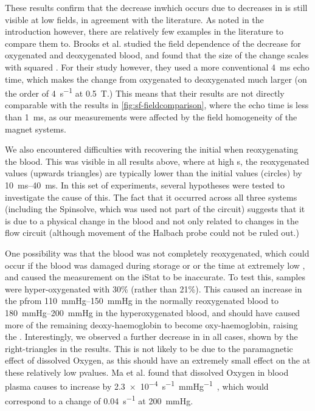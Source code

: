 These results confirm that the decrease in\Ttwo which occurs due to decreases in \SOtwo is still visible at low fields, in agreement with the literature.
As noted in the introduction however, there are relatively few examples in the literature to compare them to.
Brooks et al. studied the field dependence of the \Ttwo decrease for oxygenated and deoxygenated blood, and found that the size of the \Rtwo change scales with \Bzero  squared \cite[Fig.1]{BrooksComparisont2relaxation1995}.
For their study however, they used a more conventional \SI{4}{ms} echo time, which makes the \Rtwo change from oxygenated to deoxygenated much larger (on the order of \SI{4}{s^{-1}} at \SI{0.5}{T}.)
This means that their results are not directly comparable with the results in \autoref{fig:sf-fieldcomparison}, where the echo time is less than \SI{1}{ms}, as our measurements were affected by the field homogeneity of the magnet systems.

We also encountered difficulties with recovering the initial \Ttwo when reoxygenating the blood.
This was visible in all results above, where at high \SOtwo{}s, the reoxygenated \Ttwo values (upwards triangles)  are typically lower than the initial values (circles) by \SIrange{10}{40}{ms}.
In this set of experiments, several hypotheses were tested to investigate the cause of this.
The fact that it occurred across all three systems (including the Spinsolve, which was used not part of the circuit) suggests that it is due to a physical change in the blood and not only related to changes in the flow circuit (although movement of the Halbach probe could not be ruled out.)

One possibility was that the blood was not completely reoxygenated, which could occur if the blood was damaged during storage or or the time at extremely low \SOtwo, and caused the \SOtwo measurement on the iStat to be inaccurate.
To test this, samples were hyper-oxygenated with 30\% \Otwo (rather than 21\%).
This caused an increase in the p\Otwo from \SIrange{110}{150}{mmHg} in the normally reoxygenated blood to \SIrange{180}{200}{mmHg} in the hyperoxygenated blood, and should have caused more of the remaining deoxy-haemoglobin to become oxy-haemoglobin, raising the \Ttwo.
Interestingly, we observed a further decrease in \Ttwo in all cases, shown by the right-triangles in the results.
This is not likely to be due to the paramagnetic effect of dissolved Oxygen, as this should have an extremely small effect on the \Ttwo at these relatively low p\Otwo values.
Ma et al. found that dissolved Oxygen in blood plasma causes \Rtwo to increase by \SI{2.3e-4}{s^{-1}\per\mmHg}~\cite{Maeffectdissolvedoxygen2016}, which would correspond to a change of \SI{0.04}{s^{-1}} at \SI{200}{mmHg}.

